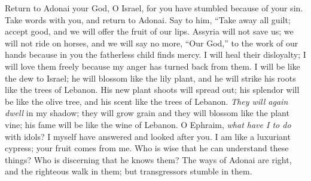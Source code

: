 \begin{biblechapter} %
 Return to Adonai your God, O Israel, 
for you have stumbled because of your sin.
\verse Take words with you, 
and return to Adonai. 
Say to him, 
“Take away all guilt; 
accept good, and we will offer 
the fruit of our lips.
\verse Assyria will not save us; 
we will not ride on horses, 
and we will say no more, “Our God,” 
to the work of our hands 
because in you the fatherless child finds mercy.
\verse I will heal their disloyalty; 
I will love them freely 
because my anger has turned back 
from them.
\verse I will be like the dew to Israel; 
he will blossom like the lily plant, 
and he will strike his roots like the trees of Lebanon.
\verse His new plant shoots will spread out; 
his splendor will be like the olive tree, 
and his scent like the trees of Lebanon.
\verse \textit{They will again dwell} in my shadow; 
they will grow grain 
and they will blossom like the plant vine; 
his fame will be like the wine of Lebanon.
\verse O Ephraim, \textit{what have I to do} with idols? 
I myself have answered and looked after you. 
I am like a luxuriant cypress; 
your fruit comes from me.
\verse Who is wise that he can understand these things? 
Who is discerning that he knows them? 
The ways of Adonai are right, 
and the righteous walk in them; 
but transgressors stumble in them.
\end{biblechapter}

